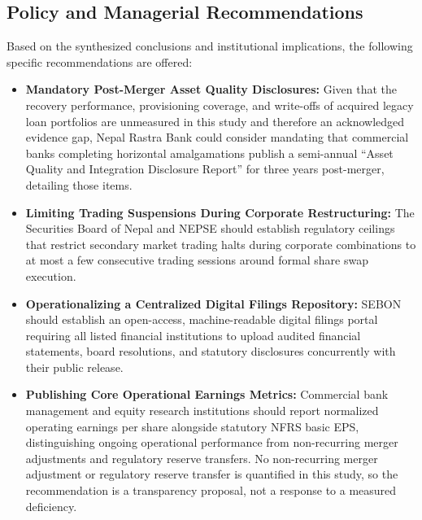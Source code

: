 \subsection{Policy and Managerial Recommendations}
Based on the synthesized conclusions and institutional implications, the following specific recommendations are offered:
\begin{itemize}
    \item \textbf{Mandatory Post-Merger Asset Quality Disclosures:} Given that the recovery performance, provisioning coverage, and write-offs of acquired legacy loan portfolios are unmeasured in this study and therefore an acknowledged evidence gap, Nepal Rastra Bank could consider mandating that commercial banks completing horizontal amalgamations publish a semi-annual ``Asset Quality and Integration Disclosure Report'' for three years post-merger, detailing those items.
    \item \textbf{Limiting Trading Suspensions During Corporate Restructuring:} The Securities Board of Nepal and NEPSE should establish regulatory ceilings that restrict secondary market trading halts during corporate combinations to at most a few consecutive trading sessions around formal share swap execution.
    \item \textbf{Operationalizing a Centralized Digital Filings Repository:} SEBON should establish an open-access, machine-readable digital filings portal requiring all listed financial institutions to upload audited financial statements, board resolutions, and statutory disclosures concurrently with their public release.
    \item \textbf{Publishing Core Operational Earnings Metrics:} Commercial bank management and equity research institutions should report normalized operating earnings per share alongside statutory NFRS basic EPS, distinguishing ongoing operational performance from non-recurring merger adjustments and regulatory reserve transfers. No non-recurring merger adjustment or regulatory reserve transfer is quantified in this study, so the recommendation is a transparency proposal, not a response to a measured deficiency.
\end{itemize}

